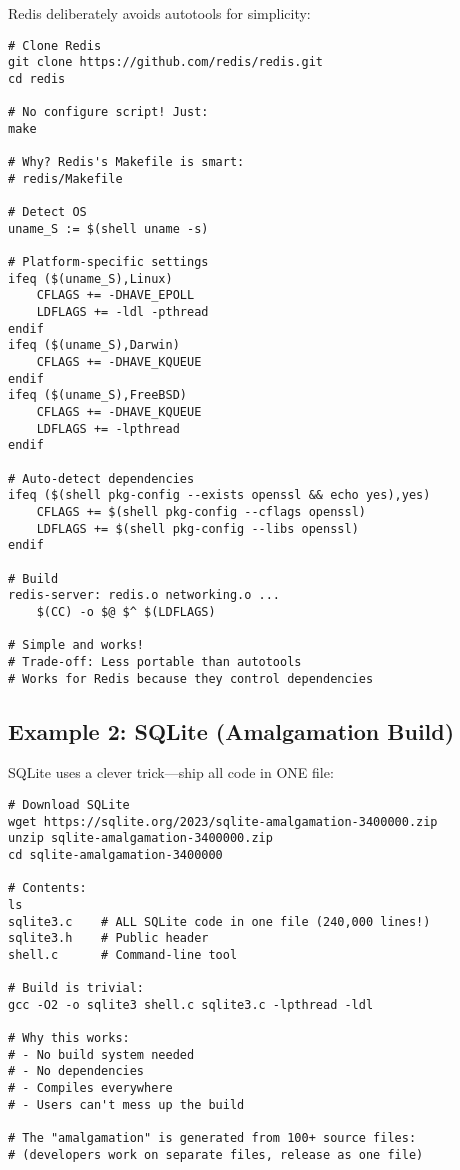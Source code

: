 Redis deliberately avoids autotools for simplicity:

\begin{lstlisting}
# Clone Redis
git clone https://github.com/redis/redis.git
cd redis

# No configure script! Just:
make

# Why? Redis's Makefile is smart:
# redis/Makefile

# Detect OS
uname_S := $(shell uname -s)

# Platform-specific settings
ifeq ($(uname_S),Linux)
    CFLAGS += -DHAVE_EPOLL
    LDFLAGS += -ldl -pthread
endif
ifeq ($(uname_S),Darwin)
    CFLAGS += -DHAVE_KQUEUE
endif
ifeq ($(uname_S),FreeBSD)
    CFLAGS += -DHAVE_KQUEUE
    LDFLAGS += -lpthread
endif

# Auto-detect dependencies
ifeq ($(shell pkg-config --exists openssl && echo yes),yes)
    CFLAGS += $(shell pkg-config --cflags openssl)
    LDFLAGS += $(shell pkg-config --libs openssl)
endif

# Build
redis-server: redis.o networking.o ...
	$(CC) -o $@ $^ $(LDFLAGS)

# Simple and works!
# Trade-off: Less portable than autotools
# Works for Redis because they control dependencies
\end{lstlisting}

\subsection{Example 2: SQLite (Amalgamation Build)}

SQLite uses a clever trick---ship all code in ONE file:

\begin{lstlisting}
# Download SQLite
wget https://sqlite.org/2023/sqlite-amalgamation-3400000.zip
unzip sqlite-amalgamation-3400000.zip
cd sqlite-amalgamation-3400000

# Contents:
ls
sqlite3.c    # ALL SQLite code in one file (240,000 lines!)
sqlite3.h    # Public header
shell.c      # Command-line tool

# Build is trivial:
gcc -O2 -o sqlite3 shell.c sqlite3.c -lpthread -ldl

# Why this works:
# - No build system needed
# - No dependencies
# - Compiles everywhere
# - Users can't mess up the build

# The "amalgamation" is generated from 100+ source files:
# (developers work on separate files, release as one file)
\end{lstlisting}

